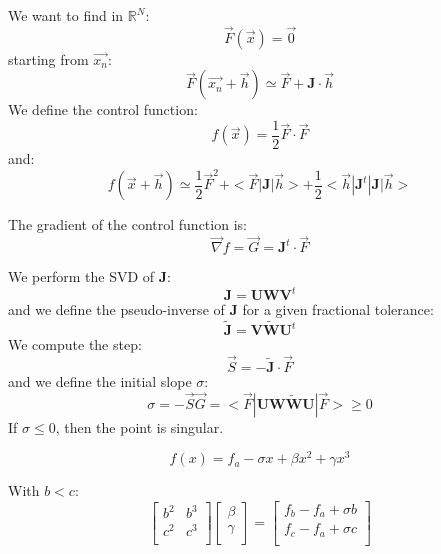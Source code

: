 \documentclass[aps,12pt]{revtex4}
\begin{document}
We want to find in $\mathbb{R}^N$:
\begin{equation}
	\vec{F}(\vec{x}) = \vec{0}
\end{equation}
starting from $\vec{x_n}$:
\begin{equation}
	\vec{F}(\vec{x_n}+\vec{h}) \simeq \vec{F} + \bm{J} \cdot \vec{h}
\end{equation}
We define the control function:
\begin{equation}
	f(\vec{x}) = \dfrac{1}{2} \vec{F} \cdot \vec{F}
\end{equation}
and:
\begin{equation}
	f(\vec{x}+\vec{h}) \simeq \dfrac{1}{2}\vec{F}^2 + <\vec{F} | \bm{J} | \vec{h} > + \dfrac{1}{2} <\vec{h}|\bm{J}^t | \bm{J} | \vec{h}>
\end{equation}

The gradient of the control function is:
\begin{equation}
	\vec{\nabla} f = \vec{G} = \bm{J}^t \cdot \vec{F}
\end{equation}

We perform the SVD of $\bm{J}$:
\begin{equation}
	\bm{J} = \bm{U} \bm{W} \bm{V}^t
\end{equation}
and we define the pseudo-inverse of $\bm{J}$ for a given fractional tolerance:
\begin{equation}
	\tilde{\bm{J}} = \bm{V} \tilde{\bm{W}} \bm{U}^t
\end{equation}	
We compute the step:
\begin{equation}
	\vec{S} = - \tilde{\bm{J}} \cdot \vec{F} 
\end{equation}
and we define the initial slope $\sigma$:
\begin{equation}
	\sigma = -\vec{S}\vec{G} = <\vec{F}| \bm{U} \bm{W}\tilde{\bm{W}}\bm{U}|\vec{F}> \geq 0
\end{equation}
If $\sigma\leq 0$, then the point is singular.

\begin{equation}
f(x) = f_a - \sigma x + \beta x^2 + \gamma x^3
\end{equation}

With $b<c$:
\begin{equation}
\begin{bmatrix}
	b^2 & b^3 \\
	c^2 & c^3 \\
\end{bmatrix}
\begin{bmatrix}
	\beta\\
	\gamma\\
\end{bmatrix}
=
\begin{bmatrix}
	f_b - f_a + \sigma b\\
	f_c - f_a + \sigma c\\
\end{bmatrix}
\end{equation}
\end{document}

